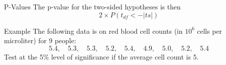 \begin{frame}{P-Values}
    The p-value for the two-sided hypotheses is then
    \[
        2\times P(t_{df} < -|ts|)
    \]
\end{frame}

\begin{frame}{Example}
    The following data is on red blood cell counts (in $10^6$ cells per microliter) for 9 people:
    \[
        5.4, \quad 5.3, \quad 5.3, \quad 5.2, \quad 5.4, \quad 4.9, \quad 5.0, \quad 5.2, \quad 5.4
    \]
    Test at the 5\% level of significance if the average cell count is 5.
\end{frame}